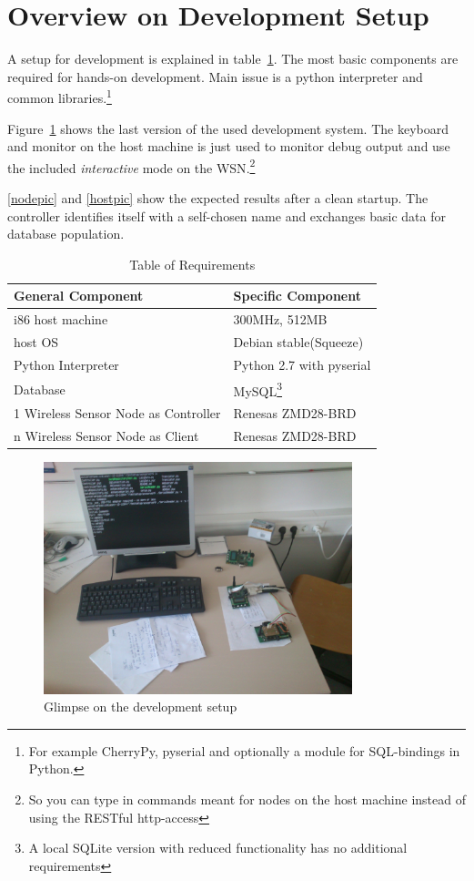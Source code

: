 \section{Overview on Development Setup}

A setup for development is explained in table~\ref{tab:requirements}. The most basic components are 
required for hands-on development. Main issue is a python interpreter and common libraries.\footnote{For example
CherryPy, pyserial and optionally a module for SQL-bindings in Python.}

Figure~\ref{setupic} shows the last version of the used development system. The keyboard and monitor on the host machine
is just used to monitor debug output and use the included \textsl{interactive} mode on the \textsc{WSN}.\footnote{So you can 
type in commands meant for nodes on the host machine instead of using the RESTful http-access}

\ref{nodepic} and \ref{hostpic} show the expected results after a clean startup. The controller identifies itself with a
self-chosen name and exchanges basic data for database population.
 

\begin{table}[h] 
\centering 
\begin{tabular}{|l||l|} 
General Component & Specific Component\\ 
\hline 
i86 host machine & 300MHz, 512MB\\ 
host OS & Debian stable(Squeeze) \\ 
Python Interpreter & Python 2.7 with pyserial \\ 
Database & MySQL\footnote{A local SQLite version with reduced functionality has no additional requirements} \\ 
1 Wireless Sensor Node as Controller & Renesas ZMD28-BRD \\
n Wireless Sensor Node as Client & Renesas ZMD28-BRD \\ 
\end{tabular} 
\caption{ Table of Requirements} 
\label{tab:requirements} 
\end{table}


\begin{figure}[H]
   \centering
   \includegraphics[width=0.8\textwidth]{pic/whole_setup.jpg}%
   \caption{Glimpse on the development setup}
   \label{setupic}%
\end{figure}


